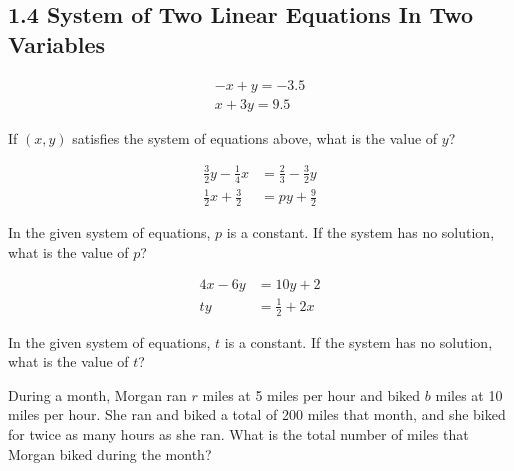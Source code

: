\subsection*{1.4 System of Two Linear Equations In Two Variables }
\vspace{0.5em}

\setcounter{questionnum}{0}

\noindent\markforreview

\vspace{0.5em}
\[
\begin{aligned}
-x + y = -3.5 \\ 
x + 3y = 9.5
\end{aligned}
  \]


If $(x, y)$ satisfies the system of equations above, what is the value of $y$?


\vspace{5em}
\noindent\markforreview

\vspace{0.5em}

\[
\begin{aligned}
\frac{3}{2}y - \frac{1}{4}x &= \frac{2}{3}-\frac{3}{2}y \\
\frac{1}{2}x + \frac{3}{2} &= py + \frac{9}{2}
\end{aligned}
\]

In the given system of equations, $p$ is a constant. If the system has no solution, what is the value of $p$?


\vspace{5em}
\noindent\markforreview

\vspace{0.5em}

\[
\begin{aligned}
4x - 6y &= 10y + 2 \\
ty &= \frac{1}{2} + 2x
\end{aligned}
\]

In the given system of equations, $t$ is a constant. If the system has no solution, what is the value of $t$?

\newpage
\noindent\markforreview

\vspace{1em}

During a month, Morgan ran $r$ miles at 5 miles per hour and biked $b$ miles at 10 miles per hour. She ran and biked a total of 200 miles that month, and she biked for twice as many hours as she ran. What is the total number of miles that Morgan biked during the month?

